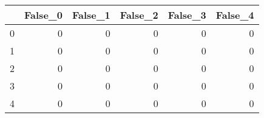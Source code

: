 \begin{tabular}{lrrrrr}
\toprule
{} &  False\_0 &  False\_1 &  False\_2 &  False\_3 &  False\_4 \\ \hline
\midrule
0 &        0 &        0 &        0 &        0 &        0 \\ \hline
1 &        0 &        0 &        0 &        0 &        0 \\ \hline
2 &        0 &        0 &        0 &        0 &        0 \\ \hline
3 &        0 &        0 &        0 &        0 &        0 \\ \hline
4 &        0 &        0 &        0 &        0 &        0 \\ \hline
\bottomrule
\end{tabular}
